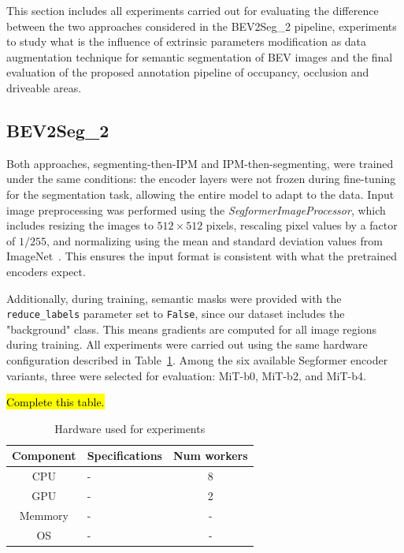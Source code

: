 
This section includes all experiments carried out for evaluating the difference between the two approaches considered in the BEV2Seg\_2 pipeline, experiments to study what is the influence of extrinsic parameters modification as data augmentation technique for semantic segmentation of BEV images and the final evaluation of the proposed annotation pipeline of occupancy, occlusion and driveable areas.

\subsection{BEV2Seg\_2}
Both approaches, segmenting-then-IPM and IPM-then-segmenting, were trained under the same conditions: the encoder layers were not frozen during fine-tuning for the segmentation task, allowing the entire model to adapt to the data. Input image preprocessing was performed using the \textit{SegformerImageProcessor}, which includes resizing the images to $512 \times 512$ pixels, rescaling pixel values by a factor of $1/255$, and normalizing using the mean and standard deviation values from ImageNet~\cite{imagenet}. This ensures the input format is consistent with what the pretrained encoders expect.

Additionally, during training, semantic masks were provided with the \texttt{reduce\_labels} parameter set to \texttt{False}, since our dataset includes the "background" class. This means gradients are computed for all image regions during training. All experiments were carried out using the same hardware configuration described in Table~\ref{tab:hardware}. Among the six available Segformer encoder variants, three were selected for evaluation: MiT-b0, MiT-b2, and MiT-b4.

\hl{Complete this table.}
\begin{table}[h]
    \centering
    \begin{tabular}{c l c}
        \toprule
        \textbf{Component} & \textbf{Specifications} & \textbf{Num workers} \\
        \midrule
        CPU         & - & 8 \\
        GPU         & - & 2 \\      
        Memmory     & - & - \\
        OS          & - & - \\
        \bottomrule
    \end{tabular}
    \caption{ Hardware used for experiments }
    \label{tab:hardware}
\end{table}

